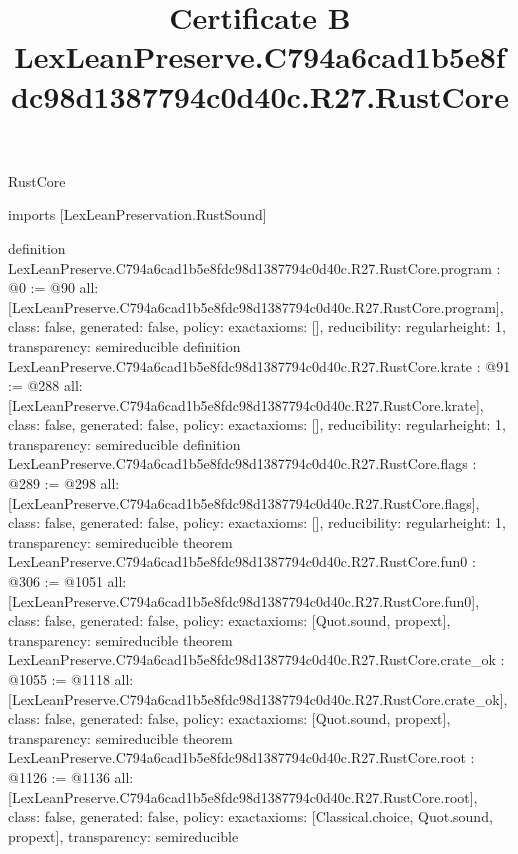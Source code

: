 \begin{lexlean}{RustCore}
\title{Certificate B LexLeanPreserve.C794a6cad1b5e8fdc98d1387794c0d40c.R27.RustCore}
\begin{coremodule}
imports [LexLeanPreservation.RustSound]

definition LexLeanPreserve.C794a6cad1b5e8fdc98d1387794c0d40c.R27.RustCore.program : @0 := @90 {
  all: [LexLeanPreserve.C794a6cad1b5e8fdc98d1387794c0d40c.R27.RustCore.program],
  class: false,
  generated: false,
  policy: exact{axioms: []},
  reducibility: regular{height: 1},
  transparency: semireducible
}
definition LexLeanPreserve.C794a6cad1b5e8fdc98d1387794c0d40c.R27.RustCore.krate : @91 := @288 {
  all: [LexLeanPreserve.C794a6cad1b5e8fdc98d1387794c0d40c.R27.RustCore.krate],
  class: false,
  generated: false,
  policy: exact{axioms: []},
  reducibility: regular{height: 1},
  transparency: semireducible
}
definition LexLeanPreserve.C794a6cad1b5e8fdc98d1387794c0d40c.R27.RustCore.flags : @289 := @298 {
  all: [LexLeanPreserve.C794a6cad1b5e8fdc98d1387794c0d40c.R27.RustCore.flags],
  class: false,
  generated: false,
  policy: exact{axioms: []},
  reducibility: regular{height: 1},
  transparency: semireducible
}
theorem LexLeanPreserve.C794a6cad1b5e8fdc98d1387794c0d40c.R27.RustCore.fun0 : @306 := @1051 {
  all: [LexLeanPreserve.C794a6cad1b5e8fdc98d1387794c0d40c.R27.RustCore.fun0],
  class: false,
  generated: false,
  policy: exact{axioms: [Quot.sound, propext]},
  transparency: semireducible
}
theorem LexLeanPreserve.C794a6cad1b5e8fdc98d1387794c0d40c.R27.RustCore.crate_ok : @1055 := @1118 {
  all: [LexLeanPreserve.C794a6cad1b5e8fdc98d1387794c0d40c.R27.RustCore.crate_ok],
  class: false,
  generated: false,
  policy: exact{axioms: [Quot.sound, propext]},
  transparency: semireducible
}
theorem LexLeanPreserve.C794a6cad1b5e8fdc98d1387794c0d40c.R27.RustCore.root : @1126 := @1136 {
  all: [LexLeanPreserve.C794a6cad1b5e8fdc98d1387794c0d40c.R27.RustCore.root],
  class: false,
  generated: false,
  policy: exact{axioms: [Classical.choice, Quot.sound, propext]},
  transparency: semireducible
}


\end{coremodule}
\end{lexlean}
